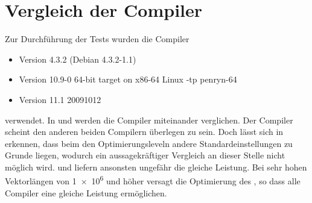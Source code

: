 % 
% 
% 
% 
% 
% 
% 
% 
% 
% 
% 
% 
% 

\section{Vergleich der Compiler}
Zur Durchführung der Tests wurden die Compiler
\begin{itemize}
 \item \gcc Version 4.3.2 (Debian 4.3.2-1.1) 
 \item \pgcc Version 10.9-0 64-bit target on x86-64 Linux -tp penryn-64 
 \item \icc Version 11.1 20091012
\end{itemize}
verwendet. In  und  werden die Compiler miteinander
verglichen. Der Compiler \pgcc scheint den anderen beiden Compilern überlegen
zu sein. Doch lässt sich in  erkennen, dass beim \pgcc den
Optimierungsleveln andere Standardeinstellungen zu Grunde liegen, wodurch ein
aussagekräftiger Vergleich an dieser Stelle nicht möglich wird. \icc und \gcc
liefern ansonsten ungefähr die gleiche Leistung. Bei sehr hohen Vektorlängen
von \num{1e6} und höher versagt die Optimierung des \pgcc, so dass alle Compiler
eine gleiche Leistung ermöglichen.

